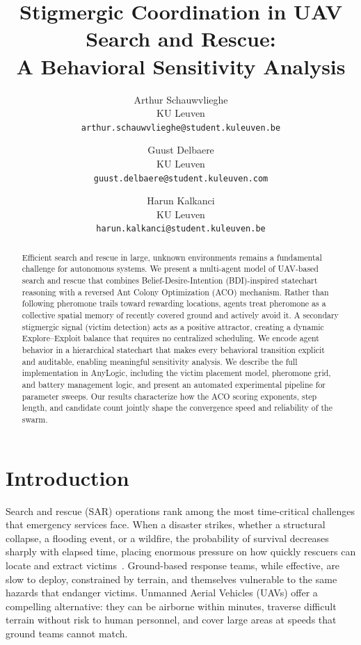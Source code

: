 \documentclass[10pt,a4paper,twocolumn]{article}
\title{Stigmergic Coordination in UAV Search and Rescue:\\A Behavioral Sensitivity Analysis}
\author{
  Arthur Schauwvlieghe \\
  {\small KU Leuven} \\
  \texttt{arthur.schauwvlieghe@student.kuleuven.be}
  \and
  Guust Delbaere \\
  {\small KU Leuven} \\
  \texttt{guust.delbaere@student.kuleuven.com}
  \and
  Harun Kalkanci \\
  {\small KU Leuven} \\
  \texttt{harun.kalkanci@student.kuleuven.be}
}
\date{}
\begin{document}
\maketitle

\begin{abstract}
Efficient search and rescue in large, unknown environments remains a fundamental challenge for autonomous systems. We present a multi-agent model of UAV-based search and rescue that combines Belief-Desire-Intention (BDI)-inspired statechart reasoning with a reversed Ant Colony Optimization (ACO) mechanism. Rather than following pheromone trails toward rewarding locations, agents treat pheromone as a collective spatial memory of recently covered ground and actively avoid it. A secondary stigmergic signal (victim detection) acts as a positive attractor, creating a dynamic Explore--Exploit balance that requires no centralized scheduling. We encode agent behavior in a hierarchical statechart that makes every behavioral transition explicit and auditable, enabling meaningful sensitivity analysis. We describe the full implementation in AnyLogic, including the victim placement model, pheromone grid, and battery management logic, and present an automated experimental pipeline for parameter sweeps. Our results characterize how the ACO scoring exponents, step length, and candidate count jointly shape the convergence speed and reliability of the swarm.
\end{abstract}

\section{Introduction}

Search and rescue (SAR) operations rank among the most time-critical challenges that emergency services face. When a disaster strikes, whether a structural collapse, a flooding event, or a wildfire, the probability of survival decreases sharply with elapsed time, placing enormous pressure on how quickly rescuers can locate and extract victims~\citep{bk:Wooldridge2009}. Ground-based response teams, while effective, are slow to deploy, constrained by terrain, and themselves vulnerable to the same hazards that endanger victims. Unmanned Aerial Vehicles (UAVs) offer a compelling alternative: they can be airborne within minutes, traverse difficult terrain without risk to human personnel, and cover large areas at speeds that ground teams cannot match.
\end{document}
